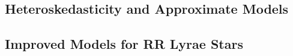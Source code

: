 \documentclass[12pt]{beamer}
\begin{document}
\subsection{Heteroskedasticity and Approximate Models}


\subsection{Improved Models for RR Lyrae Stars}












\end{document}
